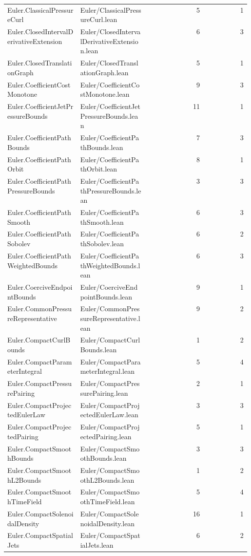 \begin{longtable}{p{0.30\linewidth}p{0.28\linewidth}rr}
Euler.ClassicalPressureCurl & Euler/ClassicalPressureCurl.lean & 5 & 1\\
Euler.ClosedIntervalDerivativeExtension & Euler/ClosedIntervalDerivativeExtension.lean & 6 & 3\\
Euler.ClosedTranslationGraph & Euler/ClosedTranslationGraph.lean & 5 & 1\\
Euler.CoefficientCostMonotone & Euler/CoefficientCostMonotone.lean & 9 & 3\\
Euler.CoefficientJetPressureBounds & Euler/CoefficientJetPressureBounds.lean & 11 & 1\\
Euler.CoefficientPathBounds & Euler/CoefficientPathBounds.lean & 7 & 3\\
Euler.CoefficientPathOrbit & Euler/CoefficientPathOrbit.lean & 8 & 1\\
Euler.CoefficientPathPressureBounds & Euler/CoefficientPathPressureBounds.lean & 3 & 3\\
Euler.CoefficientPathSmooth & Euler/CoefficientPathSmooth.lean & 6 & 3\\
Euler.CoefficientPathSobolev & Euler/CoefficientPathSobolev.lean & 6 & 2\\
Euler.CoefficientPathWeightedBounds & Euler/CoefficientPathWeightedBounds.lean & 6 & 3\\
Euler.CoerciveEndpointBounds & Euler/CoerciveEndpointBounds.lean & 9 & 1\\
Euler.CommonPressureRepresentative & Euler/CommonPressureRepresentative.lean & 9 & 2\\
Euler.CompactCurlBounds & Euler/CompactCurlBounds.lean & 1 & 2\\
Euler.CompactParameterIntegral & Euler/CompactParameterIntegral.lean & 5 & 4\\
Euler.CompactPressurePairing & Euler/CompactPressurePairing.lean & 2 & 1\\
Euler.CompactProjectedEulerLaw & Euler/CompactProjectedEulerLaw.lean & 3 & 3\\
Euler.CompactProjectedPairing & Euler/CompactProjectedPairing.lean & 5 & 1\\
Euler.CompactSmoothBounds & Euler/CompactSmoothBounds.lean & 3 & 3\\
Euler.CompactSmoothL2Bounds & Euler/CompactSmoothL2Bounds.lean & 1 & 2\\
Euler.CompactSmoothTimeField & Euler/CompactSmoothTimeField.lean & 5 & 4\\
Euler.CompactSolenoidalDensity & Euler/CompactSolenoidalDensity.lean & 16 & 1\\
Euler.CompactSpatialJets & Euler/CompactSpatialJets.lean & 6 & 2\\

\end{longtable}
